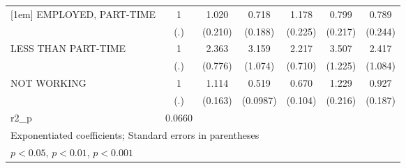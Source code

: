 {\begin{tabular}{l*{6}{c}}
[1em]
EMPLOYED, PART-TIME           &         1         &     1.020         &     0.718         &     1.178         &     0.799         &     0.789         \\
                              &       (.)         &   (0.210)         &   (0.188)         &   (0.225)         &   (0.217)         &   (0.244)         \\
[1em]
LESS THAN PART-TIME           &         1         &     2.363\sym{**} &     3.159\sym{***}&     2.217\sym{*}  &     3.507\sym{***}&     2.417\sym{*}  \\
                              &       (.)         &   (0.776)         &   (1.074)         &   (0.710)         &   (1.225)         &   (1.084)         \\
[1em]
NOT WORKING                   &         1         &     1.114         &     0.519\sym{***}&     0.670\sym{**} &     1.229         &     0.927         \\
                              &       (.)         &   (0.163)         &  (0.0987)         &   (0.104)         &   (0.216)         &   (0.187)         \\
\hline
r2\_p                          &    0.0660         &                   &                   &                   &                   &                   \\
\hline\hline
\multicolumn{7}{l}{\footnotesize Exponentiated coefficients; Standard errors in parentheses}\\
\multicolumn{7}{l}{\footnotesize \sym{*} \(p<0.05\), \sym{**} \(p<0.01\), \sym{***} \(p<0.001\)}\\
\end{tabular}
}
